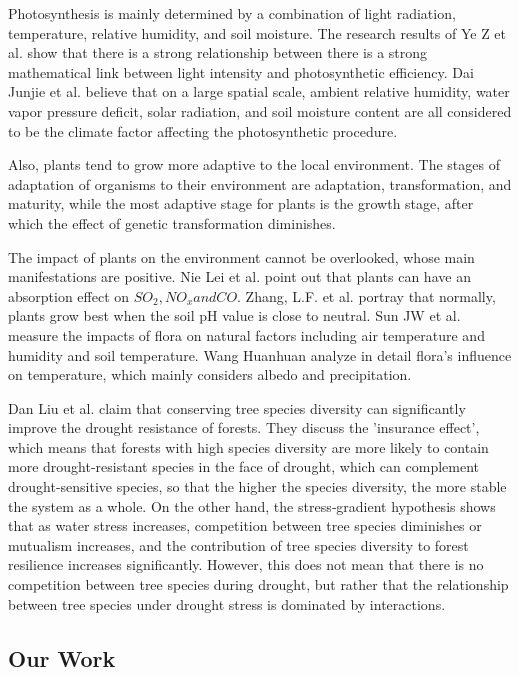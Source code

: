 \documentclass[12pt]{article}  %
\begin{document}
Photosynthesis is mainly determined by a combination of light radiation, temperature, relative humidity, and soil moisture. The research results of Ye Z et al.{\cite{4}}{\cite{5}} show that there is a strong relationship between there is a strong mathematical link between light intensity and photosynthetic efficiency.  Dai Junjie et al.{\cite{6}} believe that on a large spatial scale, ambient relative humidity, water vapor pressure deficit, solar radiation, and soil moisture content are all considered to be the climate factor affecting the photosynthetic procedure.

Also, plants tend to grow more adaptive to the local environment{\cite{11}}. The stages of adaptation of organisms to their environment are adaptation, transformation, and maturity, while the most adaptive stage for plants is the growth stage, after which the effect of genetic transformation diminishes.

The impact of plants on the environment cannot be overlooked, whose main manifestations are positive. Nie Lei et al. {\cite{7}} point out that plants can have an absorption effect on $SO_2, NO_x and CO$. Zhang, L.F. et al.{\cite{8}} portray that normally, plants grow best when the soil pH value is close to neutral. Sun JW et al.{\cite{9}} measure the impacts of flora on natural factors including air temperature and humidity and soil temperature. Wang Huanhuan{\cite{10}} analyze in detail flora's influence on temperature, which mainly considers albedo and precipitation. 


Dan Liu et al. {\cite{12}} claim that conserving tree species diversity can significantly improve the drought resistance of forests. They discuss the 'insurance effect', which means that forests with high species diversity are more likely to contain more drought-resistant species in the face of drought, which can complement drought-sensitive species, so that the higher the species diversity, the more stable the system as a whole. On the other hand, the stress‐gradient hypothesis {\cite{13}} shows that as water stress increases, competition between tree species diminishes or mutualism increases, and the contribution of tree species diversity to forest resilience increases significantly. However, this does not mean that there is no competition between tree species during drought, but rather that the relationship between tree species under drought stress is dominated by interactions.

\vspace{-0.5cm}
\subsection{Our Work}
\vspace{-0.3cm}
\end{document}
